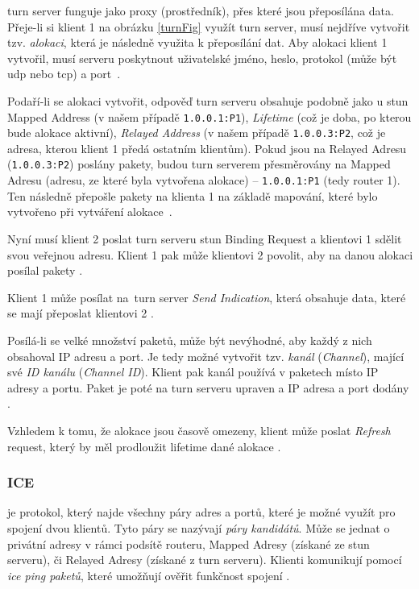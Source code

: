 \gls{turn} server funguje jako proxy (prostředník), přes které jsou přeposílána
data. Přeje-li si klient 1 na obrázku \ref{turnFig} využít \gls{turn} server,
musí nejdříve vytvořit tzv. \textit{alokaci}, která je následně využita k
přeposílání dat. Aby alokaci klient 1 vytvořil, musí serveru poskytnout
uživatelské jméno, heslo, protokol (může být \gls{udp} nebo \gls{tcp}) a
port~\parencite{WebRTCForTheCurious}.

Podaří-li se alokaci vytvořit, odpověď \gls{turn} serveru obsahuje podobně jako
u \gls{stun} Mapped Address (v našem případě \texttt{1.0.0.1:P1}),
\textit{Lifetime} (což je doba, po kterou bude alokace aktivní), \textit{Relayed
    Address} (v našem případě \texttt{1.0.0.3:P2}, což je adresa, kterou
klient 1 předá ostatním klientům). Pokud jsou na Relayed Adresu
(\texttt{1.0.0.3:P2}) poslány pakety, budou \gls{turn} serverem
přesměrovány na Mapped Adresu (adresu, ze které byla vytvořena alokace) --
\texttt{1.0.0.1:P1} (tedy router 1). Ten následně přepošle pakety na
klienta 1 na základě mapování, které bylo vytvořeno při vytváření
alokace~\parencite{WebRTCForTheCurious}.

Nyní musí klient 2 poslat \gls{turn} serveru \gls{stun} Binding Request a
klientovi 1 sdělit svou veřejnou adresu. Klient 1 pak může klientovi 2 povolit,
aby na danou alokaci posílal pakety \parencite{WebRTCForTheCurious}.

Klient 1 může posílat na~\gls{turn} server \textit{Send Indication}, která
obsahuje data, které se mají přeposlat klientovi 2
\parencite{WebRTCForTheCurious}.

Posílá-li se velké množství paketů, může být nevýhodné, aby každý z nich
obsahoval IP adresu a port. Je tedy možné vytvořit tzv. \textit{kanál}
(\textit{Channel}), mající své \textit{ID kanálu} (\textit{Channel ID}). Klient
pak kanál používá v paketech místo IP adresy a portu. Paket je poté na
\gls{turn} serveru upraven a IP adresa a port dodány
\parencite{WebRTCForTheCurious}.

Vzhledem k tomu, že alokace jsou časově omezeny, klient může poslat
\textit{Refresh} request, který by měl prodloužit lifetime dané alokace
\parencite{WebRTCForTheCurious}.

\subsubsection{ICE}\label{ice}

 je protokol, který najde všechny páry adres a portů, které je
možné využít pro spojení dvou klientů. Tyto páry se nazývají \textit{páry
    kandidátů}. Může se jednat o privátní adresy v rámci podsítě routeru, Mapped
Adresy (získané ze \gls{stun} serveru), či Relayed Adresy (získané z \gls{turn}
serveru). Klienti komunikují pomocí \textit{\gls{ice} ping paketů}, které
umožňují ověřit funkčnost spojení \parencite{WebRTCForTheCurious}.

